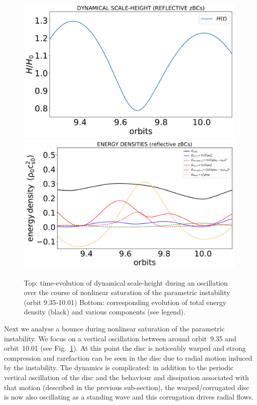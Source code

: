 \documentclass[fleqn,usenatbib]{mnras}
\begin{document}
\begin{figure}
\centering
\includegraphics[scale=0.3]{Figures/figure00PRODUCTION_VSTRHYDRORes32Re4687H6BounceHigherCadenceOrb8toOrb12_dynamicalH_NLsaturation.pdf}
\includegraphics[scale=0.3]{Figures/figure00PRODUCTION_VSTRHYDRORes32Re4687H6BounceHigherCadenceOrb8toOrb12_energydensities_NLsaturation.pdf}
\caption{Top: time-evolution of dynamical scale-height during an oscillation over the course of nonlinear saturation of the parametric instability (orbit 9.35-10.01) Bottom: corresponding evolution of total energy density (black) and various components (see legend).}
\label{FIGURE_EnergeticsNonlinearSaturationFreeBounceSim}
\end{figure}

Next we analyse a bounce during nonlinear saturation of the parametric instability. We focus on a vertical oscillation between around orbit~9.35 and orbit~10.01 (see Fig.~\ref{FIGURE_EnergeticsNonlinearSaturationFreeBounceSim}). At this point the disc is noticeably warped and strong compression and rarefaction can be seen in the disc due to radial motion induced by the instability. The dynamics is complicated: in addition to the periodic vertical oscillation of the disc and the behaviour and dissipation associated with that motion (described in the previous sub-section), the warped/corrugated disc is now also oscillating as a standing wave and this corrugation drives radial flows. 
\end{document}
